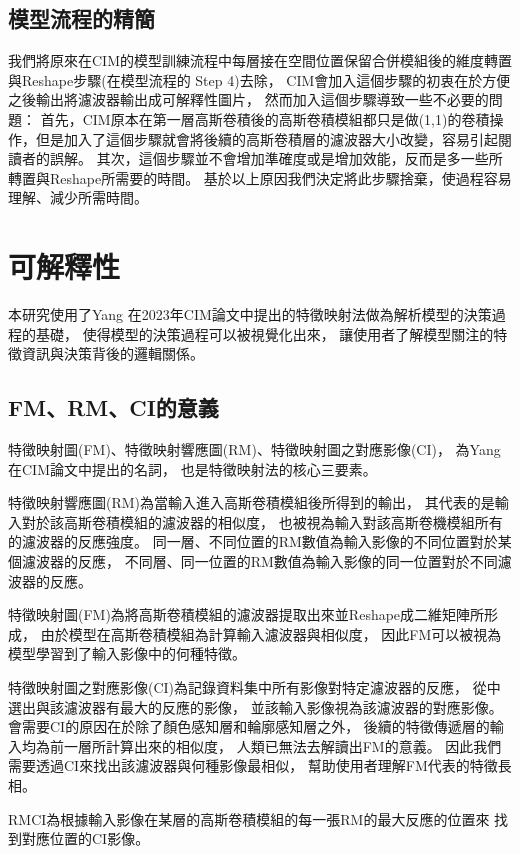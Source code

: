 \documentclass[class=NCU_thesis, crop=false]{standalone}
\begin{document}
	\subsection{模型流程的精簡}

	我們將原來在CIM的模型訓練流程中每層接在空間位置保留合併模組後的維度轉置與Reshape步驟(在\cite{YangCNNInterpretable}模型流程的 Step 4)去除，
	CIM會加入這個步驟的初衷在於方便之後輸出將濾波器輸出成可解釋性圖片，
	然而加入這個步驟導致一些不必要的問題：
	首先，CIM原本在第一層高斯卷積後的高斯卷積模組都只是做(1,1)的卷積操作，但是加入了這個步驟就會將後續的高斯卷積層的濾波器大小改變，容易引起閱讀者的誤解。
	其次，這個步驟並不會增加準確度或是增加效能，反而是多一些所轉置與Reshape所需要的時間。
	基於以上原因我們決定將此步驟捨棄，使過程容易理解、減少所需時間。


\pagebreak
\section{可解釋性} 
本研究使用了Yang 在2023年CIM論文中提出的特徵映射法做為解析模型的決策過程的基礎，
使得模型的決策過程可以被視覺化出來，
讓使用者了解模型關注的特徵資訊與決策背後的邏輯關係。
	
	\subsection{FM、RM、CI的意義}
	\label{section:InterablePicture}
	特徵映射圖(FM)、特徵映射響應圖(RM)、特徵映射圖之對應影像(CI)，
	為Yang在CIM論文中提出的名詞，
	也是特徵映射法的核心三要素。

	特徵映射響應圖(RM)為當輸入進入高斯卷積模組後所得到的輸出，
	其代表的是輸入對於該高斯卷積模組的濾波器的相似度，
	也被視為輸入對該高斯卷機模組所有的濾波器的反應強度。
	同一層、不同位置的RM數值為輸入影像的不同位置對於某個濾波器的反應，
	不同層、同一位置的RM數值為輸入影像的同一位置對於不同濾波器的反應。

	特徵映射圖(FM)為將高斯卷積模組的濾波器提取出來並Reshape成二維矩陣所形成，
	由於模型在高斯卷積模組為計算輸入濾波器與相似度，
	因此FM可以被視為模型學習到了輸入影像中的何種特徵。

	特徵映射圖之對應影像(CI)為記錄資料集中所有影像對特定濾波器的反應，
	從中選出與該濾波器有最大的反應的影像，
	並該輸入影像視為該濾波器的對應影像。
	會需要CI的原因在於除了顏色感知層和輪廓感知層之外，
	後續的特徵傳遞層的輸入均為前一層所計算出來的相似度，
	人類已無法去解讀出FM的意義。
	因此我們需要透過CI來找出該濾波器與何種影像最相似，
	幫助使用者理解FM代表的特徵長相。

	RM\-CI為根據輸入影像在某層的高斯卷積模組的每一張RM的最大反應的位置來
	找到對應位置的CI影像。
\end{document}
